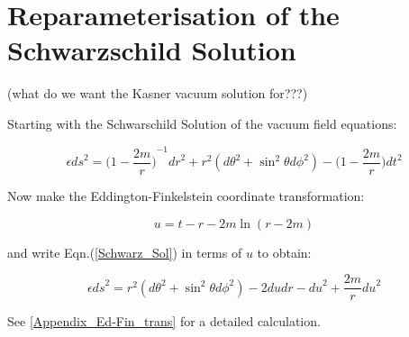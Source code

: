 \section{Reparameterisation of the Schwarzschild Solution}

(what do we want the Kasner vacuum solution for???)

\noindent Starting with the Schwarschild Solution of the vacuum field equations:

\begin{equation}\label{Schwarz_Sol} 
\epsilon {ds}^2 = {\big(1 - \frac{2m}{r}\big)}^{-1} {dr}^{2} + r^2 ({d\theta}^2 + {{\sin}^2 \theta}{d \phi}^2) - \big(1 - \frac{2m}{r}\big) {dt}^2
\end{equation}

\noindent Now make the Eddington-Finkelstein coordinate transformation:

\begin{equation}\label{Ed-Fin_trans}
u = t - r - 2m \ln(r - 2m)
\end{equation}

\noindent and write Eqn.(\ref{Schwarz_Sol}) in terms of $u$ to obtain:

\begin{equation*} 
\epsilon {ds}^{2} = r^2 ({d\theta}^2 + {{\sin}^2 \theta}{d \phi}^2) - 2 du dr - {du}^{2} + \frac{2m}{r} {du}^{2} 
\end{equation*}

\noindent See \ref{Appendix_Ed-Fin_trans} for a detailed calculation. 
  

